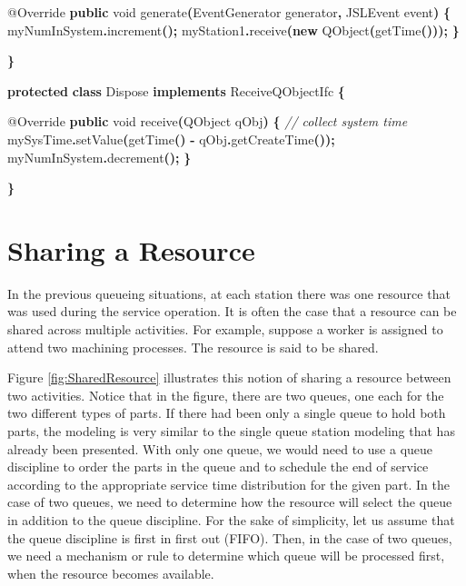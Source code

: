 \documentclass[
]{book}
\newenvironment{Shaded}{\begin{snugshade}}{\end{snugshade}}
\newcommand{\AttributeTok}[1]{\textcolor[rgb]{0.77,0.63,0.00}{#1}}
\newcommand{\CommentTok}[1]{\textcolor[rgb]{0.56,0.35,0.01}{\textit{#1}}}
\newcommand{\DataTypeTok}[1]{\textcolor[rgb]{0.13,0.29,0.53}{#1}}
\newcommand{\FunctionTok}[1]{\textcolor[rgb]{0.00,0.00,0.00}{#1}}
\newcommand{\KeywordTok}[1]{\textcolor[rgb]{0.13,0.29,0.53}{\textbf{#1}}}
\newcommand{\NormalTok}[1]{#1}
\newcommand{\OperatorTok}[1]{\textcolor[rgb]{0.81,0.36,0.00}{\textbf{#1}}}
\theoremstyle{definition}
\theoremstyle{definition}
\theoremstyle{definition}
\theoremstyle{definition}
\theoremstyle{remark}
\begin{document}
\begin{Shaded}
\begin{Highlighting}[]
        \AttributeTok{@Override}
        \KeywordTok{public} \DataTypeTok{void} \FunctionTok{generate}\OperatorTok{(}\NormalTok{EventGenerator generator}\OperatorTok{,}\NormalTok{ JSLEvent event}\OperatorTok{)} \OperatorTok{\{}
\NormalTok{            myNumInSystem}\OperatorTok{.}\FunctionTok{increment}\OperatorTok{();}
\NormalTok{            myStation1}\OperatorTok{.}\FunctionTok{receive}\OperatorTok{(}\KeywordTok{new} \FunctionTok{QObject}\OperatorTok{(}\FunctionTok{getTime}\OperatorTok{()));}
        \OperatorTok{\}}

    \OperatorTok{\}}

    \KeywordTok{protected} \KeywordTok{class}\NormalTok{ Dispose }\KeywordTok{implements}\NormalTok{ ReceiveQObjectIfc }\OperatorTok{\{}

        \AttributeTok{@Override}
        \KeywordTok{public} \DataTypeTok{void} \FunctionTok{receive}\OperatorTok{(}\NormalTok{QObject qObj}\OperatorTok{)} \OperatorTok{\{}
           \CommentTok{// collect system time}
\NormalTok{            mySysTime}\OperatorTok{.}\FunctionTok{setValue}\OperatorTok{(}\FunctionTok{getTime}\OperatorTok{()} \OperatorTok{{-}}\NormalTok{ qObj}\OperatorTok{.}\FunctionTok{getCreateTime}\OperatorTok{());}
\NormalTok{            myNumInSystem}\OperatorTok{.}\FunctionTok{decrement}\OperatorTok{();}
        \OperatorTok{\}}
        
    \OperatorTok{\}}
\end{Highlighting}
\end{Shaded}

\hypertarget{dem:sharedResources}{%
\section{Sharing a Resource}\label{dem:sharedResources}}

In the previous queueing situations, at each station there was one
resource that was used during the service operation. It is often the
case that a resource can be shared across multiple activities. For
example, suppose a worker is assigned to attend two machining processes.
The resource is said to be shared.

Figure \ref{fig:SharedResource} illustrates this notion of sharing a
resource between two activities. Notice that in the figure, there are
two queues, one each for the two different types of parts. If there had
been only a single queue to hold both parts, the modeling is very
similar to the single queue station modeling that has already been
presented. With only one queue, we would need to use a queue discipline
to order the parts in the queue and to schedule the end of service
according to the appropriate service time distribution for the given
part. In the case of two queues, we need to determine how the resource
will select the queue in addition to the queue discipline. For the sake
of simplicity, let us assume that the queue discipline is first in first
out (FIFO). Then, in the case of two queues, we need a mechanism or rule
to determine which queue will be processed first, when the resource
becomes available.
\end{document}
